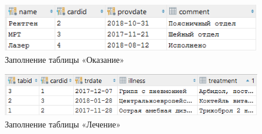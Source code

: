 \documentclass[14pt,a4paper,russian]{extreport}
\begin{document}
\vspace{0.00mm}

\begin{figure}[h!]
        \center\includegraphics[scale=1]{serviceprovision}
        \caption{Заполнение таблицы «Оказание»}
        \label{fig:serviceprovision}
\end{figure}

\vspace{0.00mm}

\begin{figure}[h!]
        \center\includegraphics[scale=1]{treatment}
        \caption{Заполнение таблицы «Лечение»}
        \label{fig:treatment}
\end{figure}
\vfill
\phantom{0000}
\end{document}
